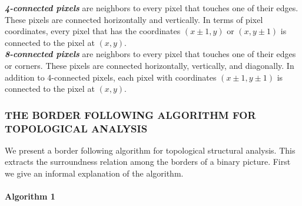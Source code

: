 \documentclass[a4paper,12pt]{book}%
\begin{document}
\textbf{\textit{4-connected pixels}} are neighbors to every pixel that touches one of their edges. These pixels are connected horizontally and vertically. In terms of pixel coordinates, every pixel that has the coordinates $(x \pm 1, y )$ or $(x, y \pm 1)$ is connected to the pixel at $(x,y)$.\\

\textbf{\textit{8-connected pixels}} are neighbors to every pixel that touches one of their edges or corners. These pixels are connected horizontally, vertically, and diagonally. In addition to 4-connected pixels, each pixel with coordinates $(x \pm 1, y \pm 1 )$ is connected to the pixel at $(x,y)$.\\

\subsubsection{THE BORDER FOLLOWING ALGORITHM FOR TOPOLOGICAL ANALYSIS}
We present a border following algorithm for topological structural analysis. This extracts the surroundness relation among the borders of a binary picture. First we give an informal explanation of the algorithm.

\paragraph{Algorithm 1}
\end{document}
